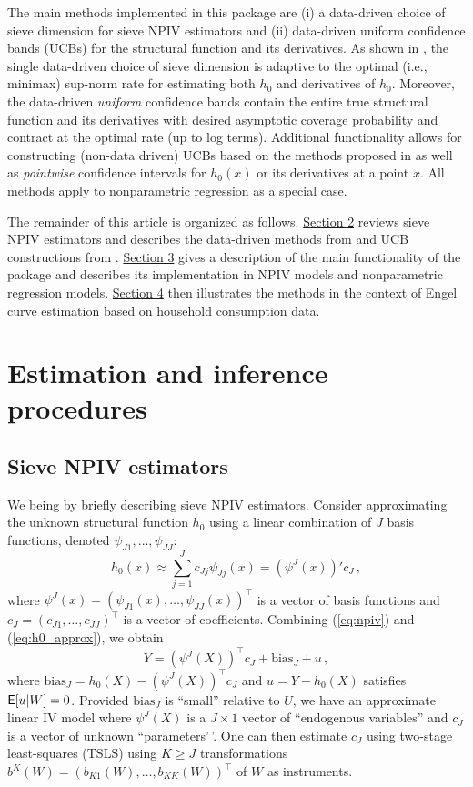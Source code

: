 \documentclass[
]{jss}
\begin{document}
The main methods implemented in this package are (i) a data-driven
choice of sieve dimension for sieve NPIV estimators and (ii) data-driven
uniform confidence bands (UCBs) for the structural function and its
derivatives. As shown in \citet{CCK}, the single data-driven choice of
sieve dimension is adaptive to the optimal (i.e., minimax) sup-norm rate
for estimating both \(h_0\) and derivatives of \(h_0\). Moreover, the
data-driven \emph{uniform} confidence bands contain the entire true
structural function and its derivatives with desired asymptotic coverage
probability and contract at the optimal rate (up to log terms).
Additional functionality allows for constructing (non-data driven) UCBs
based on the methods proposed in \citet{CCQE} as well as
\emph{pointwise} confidence intervals for \(h_0(x)\) or its derivatives
at a point \(x\). All methods apply to nonparametric regression as a
special case.

The remainder of this article is organized as follows.
\protect\hyperlink{method}{Section 2} reviews sieve NPIV estimators and
describes the data-driven methods from \citet{CCK} and UCB constructions
from \citet{CCQE}. \protect\hyperlink{desc}{Section 3} gives a
description of the main functionality of the package  and
describes its implementation in NPIV models and nonparametric regression
models. \protect\hyperlink{engel}{Section 4} then illustrates the
methods in the context of Engel curve estimation based on household
consumption data.

\hypertarget{method}{%
\section{Estimation and inference procedures}\label{method}}

\hypertarget{sieve-npiv-estimators}{%
\subsection{Sieve NPIV estimators}\label{sieve-npiv-estimators}}

We being by briefly describing sieve NPIV estimators. Consider
approximating the unknown structural function \(h_0\) using a linear
combination of \(J\) basis functions, denoted
\(\psi_{J1},\ldots,\psi_{JJ}\): \begin{equation}\label{eq:h0_approx}
 h_0(x) \approx \sum_{j=1}^J c_{Jj} \psi_{Jj}(x) = (\psi^J(x))'c_J\,,
\end{equation} where
\(\psi^J(x) = (\psi_{J1}(x),\ldots,\psi_{JJ}(x))^\top\) is a vector of
basis functions and \(c_J = (c_{J1},\ldots,c_{JJ})^\top\) is a vector of
coefficients. Combining (\ref{eq:npiv}) and (\ref{eq:h0_approx}), we
obtain \[
 Y = (\psi^J(X))^\top c_J + \mathrm{bias}_J + u\,,
\] where \(\mathrm{bias}_J = h_0(X) - (\psi^J(X))^\top c_J\) and
\(u = Y - h_0(X)\) satisfies \(\mathsf{E}[u|W] = 0\). Provided
\(\mathrm{bias}_J\) is ``small'' relative to \(U\), we have an
approximate linear IV model where \(\psi^J(X)\) is a \(J\times 1\)
vector of ``endogenous variables'' and \(c_J\) is a vector of unknown
``parameters'\,'. One can then estimate \(c_J\) using two-stage
least-squares (TSLS) using \(K \geq J\) transformations
\(b^K(W)= (b_{K1}(W),\ldots,b_{KK}(W))^\top\) of \(W\) as instruments.
\end{document}

